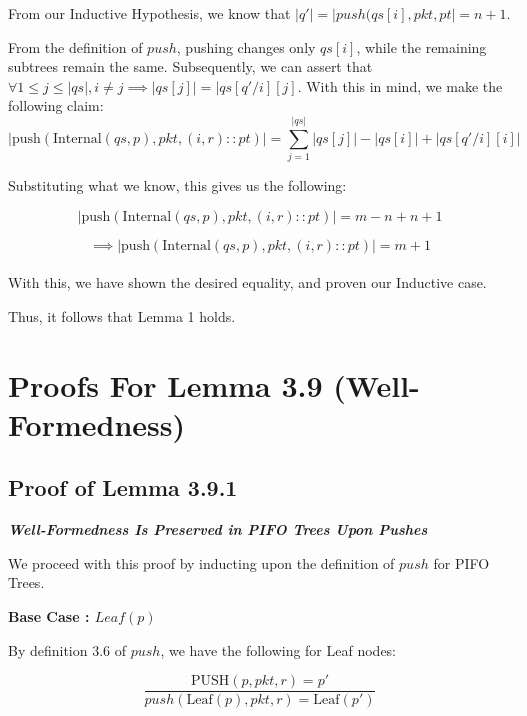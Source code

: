 \documentclass{article}
\begin{document}
\noindent From our Inductive Hypothesis, we know that $|q'| = |push(qs[i], pkt, pt| = n+1$.\newline

\noindent From the definition of $push$, pushing changes only $qs[i]$, while the remaining subtrees remain the same. Subsequently, we can assert that $\forall 
1 \leq j \leq |qs|, i \neq j \implies |qs[j]| = |qs[q'/i][j]$. With this in mind, we make the following claim:\\[-15pt]

$$|\text{push}(\text{Internal}(qs, p), pkt, (i, r) :: pt)| = \sum_{j=1}^{|qs|} |qs[j]| - |qs[i]| + |qs[q'/i][i]|$$

\noindent Substituting what we know, this gives us the following:

$$|\text{push}(\text{Internal}(qs, p), pkt, (i, r) :: pt)| = m - n + n + 1$$

$$\implies |\text{push}(\text{Internal}(qs, p), pkt, (i, r) :: pt)| = m + 1$$\\[-15pt]

\noindent With this, we have shown the desired equality, and proven our Inductive case.\newline

\noindent Thus, it follows that Lemma 1 holds.\newline

\section{Proofs For Lemma 3.9 (Well-Formedness)}

\subsection{Proof of Lemma 3.9.1}
\noindent \textit{\textbf{Well-Formedness Is Preserved in PIFO Trees Upon Pushes}}\newline

\noindent We proceed with this proof by inducting upon the definition of $push$ for PIFO Trees.\newline

\noindent \textbf{Base Case : $Leaf(p)$}\newline

\noindent By definition 3.6 of $push$, we have the following for Leaf nodes:

$$\frac{\text{PUSH}(p, pkt, r) = p'}{push(\text{Leaf}(p), pkt, r) = \text{Leaf}(p')}$$\\[-10pt]
\end{document}
